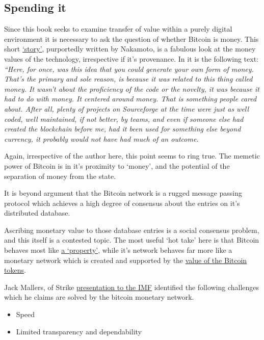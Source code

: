 \begin{itemize}
\subsection{Spending it}
Since this book seeks to examine transfer of value within a purely digital environment it is necessary to ask the question of whether Bitcoin is money. This short \href{https://bitcoin-zar.blogspot.com/2018/07/duality-excerpt-by-satoshi-nakomoto.html}{`story'}, purportedly written by Nakamoto, is a fabulous look at the money values of the technology, irrespective if it's provenance. In it is the following text: \textit{``Here, for once, was this idea that you could generate your own form of money. That's the primary and sole reason, is because it was related to this thing called money. It wasn't about the proficiency of the code or the novelty, it was because it had to do with money. It centered around money. That is something people cared about. After all, plenty of projects on Sourceforge at the time were just as well coded, well maintained, if not better, by teams, and even if someone else had created the blockchain before me, had it been used for something else beyond currency, it probably would not have had much of an outcome.}\par
Again, irrespective of the author here, this point seems to ring true. The memetic power of Bitcoin is in it's proximity to `money', and the potential of the separation of money from the state. \par
It is beyond argument that the Bitcoin network is a rugged message passing protocol which achieves a high degree of consensus about the entries on it's distributed database.\par Ascribing monetary value to those database entries is a social consensus problem, and this itself is a contested topic. The most useful `hot take' here is that Bitcoin behaves most like \href{https://twitter.com/saylor/status/1395788419301773312}{a `property'}, while it's network behaves far more like a monetary network which is created and supported by the \href{https://saito.tech/an-response-to-paul-krugman-from-a-keynesian-bitcoiner/}{value of the Bitcoin tokens}. \par
Jack Mallers, of Strike \href{https://www.youtube.com/watch?v=jb-45m9f76I}{presentation to the IMF} identified the following challenges which he claims are solved by the bitcoin monetary network.
\begin{itemize}
\item Speed
\item Limited transparency and dependability

\end{itemize}
\end{itemize}
